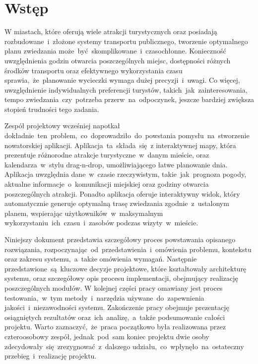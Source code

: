 
\chapter{Wstęp}
\label{ch:wstep}

W miastach, które oferują wiele atrakcji turystycznych oraz posiadają rozbudowane~i~złożone systemy transportu publicznego, tworzenie optymalnego planu zwiedzania może~być~skomplikowane~i~czasochłonne.
Konieczność uwzględnienia godzin otwarcia poszczególnych miejsc, dostępności różnych środków transportu oraz efektywnego wykorzystania czasu sprawia,~że~planowanie wycieczki wymaga dużej precyzji~i~uwagi.
Co więcej, uwzględnienie indywidualnych preferencji turystów, takich~jak~zainteresowania, tempo zwiedzania~czy~potrzeba przerw~na~odpoczynek, jeszcze bardziej zwiększa stopień trudności tego zadania.

Zespół projektowy wcześniej napotkał dokładnie~ten~problem,~co~doprowadziło~do~powstania pomysłu~na~stworzenie nowatorskiej aplikacji.
Aplikacja~ta~składa~się~z interaktywnej mapy, która prezentuje różnorodne atrakcje turystyczne~w~danym mieście, oraz kalendarza~w~stylu \gls{drag-n-drop}, umożliwiającego łatwe planowanie dnia.
Aplikacja uwzględnia dane~w~czasie rzeczywistym, takie~jak~prognoza pogody, aktualne informacje~o~komunikacji miejskiej oraz godziny otwarcia poszczególnych atrakcji.
Ponadto aplikacja oferuje interaktywny widok, który automatycznie generuje optymalną trasę zwiedzania zgodnie~z~ustalonym planem, wspierając użytkowników~w~maksymalnym wykorzystaniu~ich~czasu~i~zasobów podczas wizyty~w~mieście.

Niniejszy dokument przedstawia szczegółowy proces powstawania opisanego rozwiązania, rozpoczynając~od~przedstawienia~i~omówienia problemu, kontekstu oraz zakresu systemu,~a~także omówienia wymagań.
Następnie przedstawione~są~kluczowe decyzje projektowe, które kształtowały architekturę systemu, oraz szczegółowy opis procesu implementacji, obejmujący realizację poszczególnych modułów.
W kolejnej części pracy omawiany jest proces testowania,~w~tym metody~i~narzędzia używane~do~zapewnienia jakości~i~niezawodności systemu.
Zakończenie pracy obejmuje prezentację osiągniętych rezultatów oraz~ich~analizę,~a~także podsumowanie całości projektu.
Warto zaznaczyć,~że~praca początkowo była realizowana przez czteroosobowy zespół, jednak~pod~sam koniec projektu dwie osoby zdecydowały~się~zrezygnować~z~dalszego udziału,~co~wpłynęło~na~ostateczny przebieg~i~realizację projektu.

